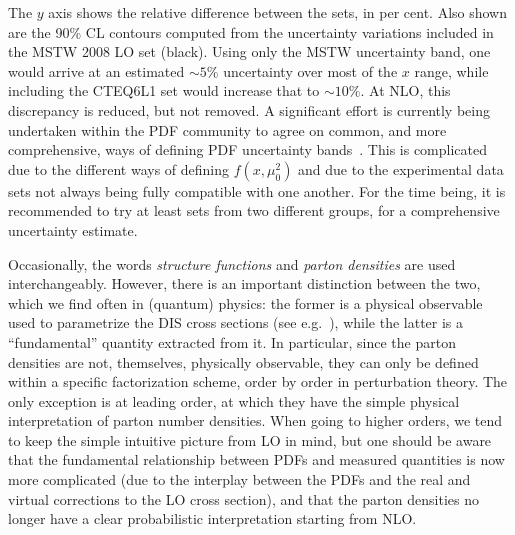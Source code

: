 The $y$ axis shows the relative difference between the sets, in per
 cent. Also shown are 
 the 90\% CL contours computed from the uncertainty variations included in the 
MSTW 2008 LO set (black). Using only the MSTW uncertainty band, 
 one would arrive at an estimated $\sim 5\%$ uncertainty over most of
 the $x$ range, while including the CTEQ6L1 set would increase that to
 $\sim 10\%$. At NLO, this discrepancy is reduced, but not removed.
 A significant effort is currently being undertaken within the PDF community 
to agree on common, and more comprehensive, ways of defining PDF uncertainty
bands~\cite{Alekhin:2011sk,Watt:2012tq}. This is complicated due to the
 different ways of defining $f(x,\mu_0^2)$ and due to 
the experimental data sets not always
being fully compatible with one another. For the
time being, it is recommended to try at least sets from two different
groups, for a comprehensive uncertainty estimate. 

%
Occasionally, the words \emph{structure functions} and \emph{parton
densities} 
are
used interchangeably. However, there is an important distinction between
the two, which we find often in (quantum) physics: the former is a
physical observable used to parametrize the DIS cross sections (see
e.g.~\cite{Dissertori:2003pj}), while the latter is a ``fundamental''
quantity extracted from it. In particular, since the parton densities
are not, themselves, physically observable, they can only be defined
within a specific factorization scheme, order by order in perturbation
theory. The only exception is at leading order, at which they have the
simple physical interpretation of parton number densities. When going to
higher orders, we tend to keep the simple intuitive picture from LO in
mind, but one should be aware that the fundamental relationship between
PDFs and measured quantities is now more complicated (due to the
interplay between the PDFs and the real and virtual corrections to the
LO cross section), and that the parton densities no longer have a clear
probabilistic interpretation starting from NLO. 

